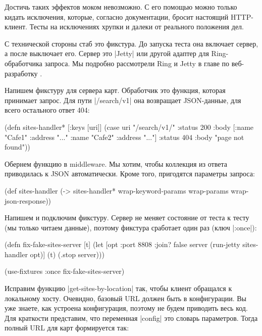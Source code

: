 Достичь таких эффектов моком невозможно. С его помощью можно только кидать
исключения, которые, согласно документации, бросит настоящий HTTP-клиент. Тесты
на исключениях хрупки и далеки от реального положения дел.

С технической стороны стаб это фикстура. До запуска теста она включает сервер, а
после выключает его. Сервер это \spverb|Jetty| или другой адаптер для
Ring-обработчика запроса. Мы подробно рассмотрели Ring и Jetty в главе по
веб-разработку .

Напишем фикстуру для сервера карт. Обработчик это функция, которая принимает
запрос. Для пути \spverb|/search/v1| она возвращает JSON-данные, для всего
остального ответ 404:

\begin{english}
  \begin{clojure}
(defn sites-handler* [{:keys [uri]}]
  (case uri
    "/search/v1/"
    {:status 200
     :body [{:name "Cafe1" :address "..."}
            {:name "Cafe2" :address "..."}]}
    {:status 404
     :body "page not found"}))
  \end{clojure}
\end{english}

Обернем функцию в middleware. Мы хотим, чтобы коллекция из ответа приводилась к
JSON автоматически. Кроме того, пригодятся параметры запроса:

\begin{english}
  \begin{clojure}
(def sites-handler
  (-> sites-handler*
      wrap-keyword-params
      wrap-params
      wrap-json-response))
  \end{clojure}
\end{english}

Напишем и подключим фикстуру. Сервер не меняет состояние от теста к тесту (мы
только читаем данные), поэтому фикстура сработает один раз (ключ
\spverb|:once|):

\begin{english}
  \begin{clojure}
(defn fix-fake-sites-server [t]
  (let [opt {:port 8808 :join? false}
        server (run-jetty sites-handler opt)]
    (t)
    (.stop server)))

(use-fixtures :once fix-fake-sites-server)
  \end{clojure}
\end{english}

Исправим функцию \spverb|get-sites-by-location| так, чтобы клиент обращался к
локальному хосту. Очевидно, базовый URL должен быть в конфигурации. Вы уже
знаете, как устроена конфигурация, поэтому не будем приводить весь код. Для
краткости представим, что переменная \spverb|config| это словарь
параметров. Тогда полный URL для карт формируется так:

